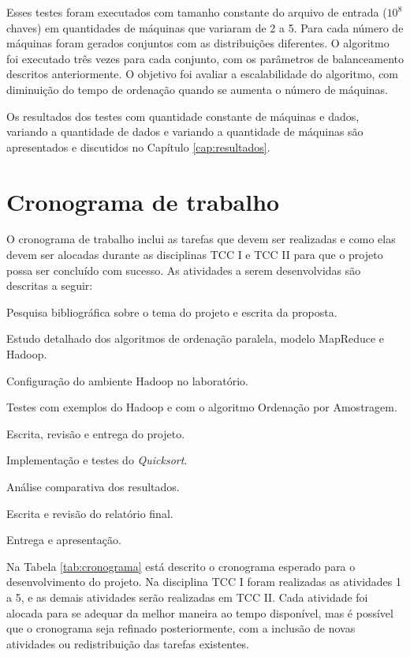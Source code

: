 Esses testes foram executados com tamanho constante do arquivo de entrada  ($10^{8}$ chaves) em quantidades de máquinas que variaram de 2 a 5. 
Para cada número de máquinas foram gerados conjuntos com as distribuições diferentes. O algoritmo foi executado três vezes para cada conjunto, com os parâmetros de balanceamento descritos anteriormente. O objetivo foi avaliar a escalabilidade do algoritmo, com diminuição do tempo de ordenação quando se aumenta o número de máquinas.


Os resultados dos testes com quantidade constante de máquinas e dados, variando a quantidade de dados e variando a quantidade de máquinas são apresentados e discutidos no Capítulo \ref{cap:resultados}.


\section{Cronograma de trabalho}


O cronograma de trabalho inclui as tarefas que devem ser realizadas e como elas devem ser alocadas durante as disciplinas TCC I e TCC II para que o projeto possa ser concluído com sucesso.
As atividades a serem desenvolvidas são descritas a seguir:

\begin{num_enum}
 \item \label{c1} Pesquisa bibliográfica sobre o tema do projeto e escrita da proposta.
 \item \label{c2} Estudo detalhado dos algoritmos de ordenação paralela,  modelo MapReduce e Hadoop.
 \item \label{c3} Configuração do ambiente Hadoop no laboratório.
 \item \label{c4} Testes com exemplos do Hadoop e com o algoritmo Ordenação por Amostragem.
 \item \label{c5} Escrita, revisão e entrega do projeto.
 \item \label{c6} Implementação e testes do \textit{Quicksort}.
 \item \label{c7} Análise comparativa dos resultados.
 \item \label{c8} Escrita e revisão do relatório final.
 \item \label{c9} Entrega e apresentação.
 \end{num_enum}
 
 
Na Tabela \ref{tab:cronograma} está descrito o cronograma esperado para o desenvolvimento do projeto. Na disciplina TCC I foram realizadas as atividades 1 a 5, e as demais atividades serão realizadas em TCC II. Cada atividade foi alocada para se adequar da melhor maneira ao tempo disponível, mas é possível que o cronograma seja refinado posteriormente, com a inclusão de novas atividades ou redistribuição das tarefas existentes. 


